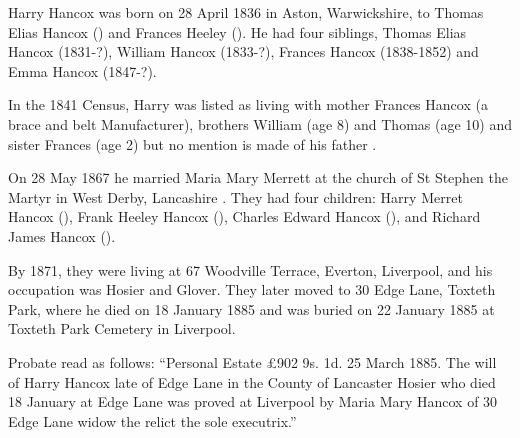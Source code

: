 
Harry Hancox was born on 28 April 1836 in Aston, Warwickshire, to Thomas Elias Hancox () and Frances Heeley ().  He had four siblings, Thomas Elias Hancox (1831-?), 
William Hancox (1833-?), Frances Hancox (1838-1852) and Emma Hancox (1847-?). 

In the 1841 Census, Harry was listed as living with mother Frances Hancox (a brace and belt Manufacturer), brothers William (age 8) and Thomas (age 10) and sister Frances (age 2) but no mention is made of his father \cite{HarryHancoxBirth}.

On 28 May 1867 he married Maria Mary Merrett at the church of St Stephen the Martyr in West Derby, Lancashire \cite{HarryHancoxMarriage}.  They had four children: Harry Merret Hancox (), Frank Heeley Hancox (), Charles Edward Hancox (), and Richard James Hancox ().

By 1871, they were living at 67 Woodville Terrace, Everton, Liverpool, and his occupation was Hosier and Glover.\cite{HarryHancoxOccupation}  They later moved to 30 Edge Lane, Toxteth Park, where he died on 18 January 1885 \cite{HarryHancoxDeath} and was buried on 22 January 1885 at Toxteth Park Cemetery in Liverpool.\cite{HHGravestone}

Probate read as follows: ``Personal Estate \pounds 902 9s. 1d. 25 March 1885. The will of Harry Hancox late of Edge Lane in the County of Lancaster Hosier who died 18 January at Edge Lane was proved at Liverpool by Maria Mary Hancox of 30 Edge Lane widow the relict the sole executrix.''
